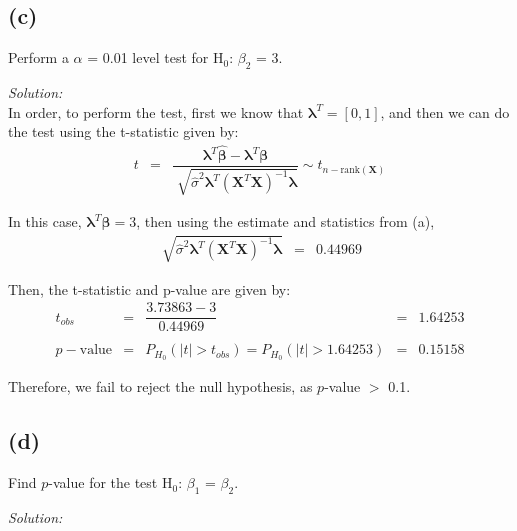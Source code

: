 \documentclass[a4paper, 11pt]{article}
\begin{document}
\subsection*{(c)} 
Perform a $\alpha$ = 0.01 level test for H$_0$: $\beta_2$ = 3.

\noindent
\textit{Solution:}\\

In order, to perform the test, first we know that $\boldsymbol{\lambda}^T = [0,1]$, and then we can do the test using the t-statistic given by:
\begin{equation*}
\begin{array}{lclllll}
t & = & \dfrac{ \boldsymbol{\lambda}^T\boldsymbol{\hat{\beta}} -  \boldsymbol{\lambda}^T\boldsymbol{\beta}}{\displaystyle\sqrt[]{\hat{\sigma}^2 \boldsymbol{\lambda}^T (\textbf{X}^T \textbf{X})^{-1} \boldsymbol{\lambda}}} \sim t_{n-\mbox{rank}(\textbf{X})}
\end{array}
\end{equation*}

In this case, $\boldsymbol{\lambda}^T\boldsymbol{\beta} = 3$, then using the estimate and statistics from (a),
\begin{equation*}
\begin{array}{lclllll}
\displaystyle\sqrt[]{\hat{\sigma}^2 \boldsymbol{\lambda}^T (\textbf{X}^T \textbf{X})^{-1} \boldsymbol{\lambda}} & = & 0.44969
\end{array}
\end{equation*}

Then, the t-statistic and p-value are given by:
\begin{equation*}
\begin{array}{lclllll}
t_{obs} & = & \dfrac{3.73863 - 3}{0.44969}&  = & 1.64253 \\\\

p-\mbox{value} & = & P_{H_0}(|t|>t_{obs}) = P_{H_0}(|t|>1.64253) & = & 0.15158
\end{array}
\end{equation*}

Therefore, we fail to reject the null hypothesis, as $p$-value $>$ 0.1.

\subsection*{(d)} 
Find $p$-value for the test H$_0$: $\beta_1$ = $\beta_2$.

\noindent
\textit{Solution:}\\
\end{document}
